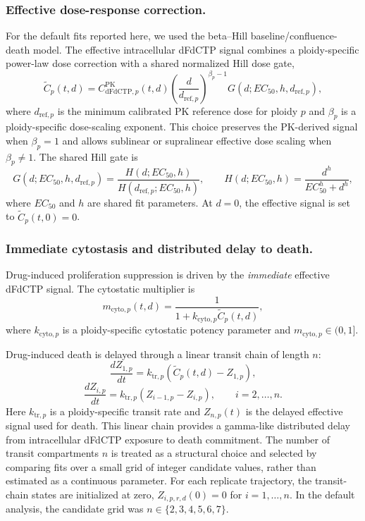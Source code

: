 \documentclass[11pt,notitlepage]{article}
\begin{document}
\subsubsection{Effective dose-response correction.}
For the default fits reported here, we used the beta--Hill baseline/confluence-death model. The effective intracellular dFdCTP signal combines a ploidy-specific power-law dose correction with a shared normalized Hill dose gate,
\[
\widetilde{C}_{p}(t,d)
=
C_{\mathrm{dFdCTP},p}^{\mathrm{PK}}(t,d)
\left(\frac{d}{d_{\mathrm{ref},p}}\right)^{\beta_p-1}
G(d;EC_{50},h,d_{\mathrm{ref},p}),
\]
where $d_{\mathrm{ref},p}$ is the minimum calibrated PK reference dose for ploidy $p$ and $\beta_p$ is a ploidy-specific dose-scaling exponent. This choice preserves the PK-derived signal when $\beta_p=1$ and allows sublinear or supralinear effective dose scaling when $\beta_p\neq 1$. The shared Hill gate is
\begin{equation}
\label{dose-responsecorrection}
G(d;EC_{50},h,d_{\mathrm{ref},p})
=
\frac{H(d;EC_{50},h)}{H(d_{\mathrm{ref},p};EC_{50},h)},
\qquad
H(d;EC_{50},h)=\frac{d^h}{EC_{50}^h+d^h},
\end{equation}
where $EC_{50}$ and $h$ are shared fit parameters. At $d=0$, the effective signal is set to $\widetilde{C}_p(t,0)=0$.

\subsubsection{Immediate cytostasis and distributed delay to death.}
Drug-induced proliferation suppression is driven by the \emph{immediate} effective dFdCTP signal. The cytostatic multiplier is
\[
m_{\mathrm{cyto},p}(t,d)
=
\frac{1}{1+k_{\mathrm{cyto},p}\widetilde{C}_{p}(t,d)},
\]
where $k_{\mathrm{cyto},p}$ is a ploidy-specific cytostatic potency parameter and $m_{\mathrm{cyto},p}\in(0,1]$.

Drug-induced death is delayed through a linear transit chain of length $n$:
\[
\frac{dZ_{1,p}}{dt}
=
k_{\mathrm{tr},p}\left(\widetilde{C}_{p}(t,d)-Z_{1,p}\right),
\]
\[
\frac{dZ_{i,p}}{dt}
=
k_{\mathrm{tr},p}\left(Z_{i-1,p}-Z_{i,p}\right),
\qquad i=2,\ldots,n.
\]
Here $k_{\mathrm{tr},p}$ is a ploidy-specific transit rate and $Z_{n,p}(t)$ is the delayed effective signal used for death. This linear chain provides a gamma-like distributed delay from intracellular dFdCTP exposure to death commitment. The number of transit compartments $n$ is treated as a structural choice and selected by comparing fits over a small grid of integer candidate values, rather than estimated as a continuous parameter. For each replicate trajectory, the transit-chain states are initialized at zero, $Z_{i,p,r,d}(0)=0$ for $i=1,\ldots,n$. In the default analysis, the candidate grid was $n\in\{2,3,4,5,6,7\}$.
\end{document}
